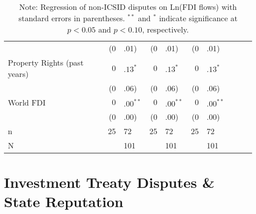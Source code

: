 \documentclass[12pt,onesided]{amsart}
\begin{document}
\begin{table}[ht]
{\begin{tabular}{lr@{} lr@{}lr@{}lr@{}lr@{}}
   & (0&.01) & (0&.01) & (0&.01) \\ 
  Property Rights (past  years) & $0$&$.13^{\ast}$ & $0$&$.13^{\ast}$ & $0$&$.13^{\ast}$ \\ 
   & (0&.06) & (0&.06) & (0&.06) \\ 
  World FDI & $0$&$.00^{\ast\ast}$ & $0$&$.00^{\ast\ast}$ & $0$&$.00^{\ast\ast}$ \\ 
   & (0&.00) & (0&.00) & (0&.00) \\ 
   \hline
n & 25&72 & 25&72 & 25&72 \\ 
  N && 101 && 101 && 101 \\ 
   \hline
\hline
\end{tabular}
}
\caption*{Note: Regression of non-ICSID disputes on Ln(FDI flows) with standard errors in parentheses. $^{**}$ and $^{*}$ indicate significance at $p< 0.05 $ and $p< 0.10 $, respectively.} 
\end{table}

\section*{Investment Treaty Disputes \& State Reputation}
\end{document}
